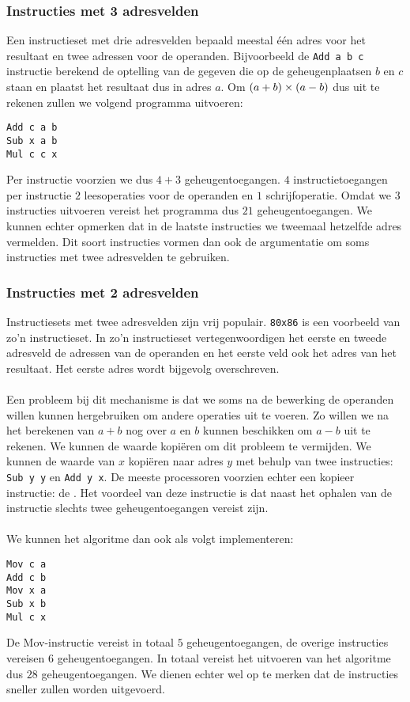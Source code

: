 \subsubsection{Instructies met 3 adresvelden}
Een instructieset met drie adresvelden bepaald meestal \'e\'en adres voor het resultaat en twee adressen voor de operanden. Bijvoorbeeld de \verb+Add a b c+ instructie berekend de optelling van de gegeven die op de geheugenplaatsen $b$ en $c$ staan en plaatst het resultaat dus in adres $a$. Om $\left( a+b \right)\times\left( a-b \right)$ dus uit te rekenen zullen we volgend programma uitvoeren:
\begin{verbatim}
Add c a b
Sub x a b
Mul c c x
\end{verbatim}
Per instructie voorzien we dus $4+3$ geheugentoegangen. $4$ instructietoegangen per instructie $2$ leesoperaties voor de operanden en $1$ schrijfoperatie. Omdat we $3$ instructies uitvoeren vereist het programma dus $21$ geheugentoegangen. We kunnen echter opmerken dat in de laatste instructies we tweemaal hetzelfde adres vermelden. Dit soort instructies vormen dan ook de argumentatie om soms instructies met twee adresvelden te gebruiken.
\subsubsection{Instructies met 2 adresvelden}
Instructiesets met twee adresvelden zijn vrij populair. \verb+80x86+ is een voorbeeld van zo'n instructieset. In zo'n instructieset vertegenwoordigen het eerste en tweede adresveld de adressen van de operanden en het eerste veld ook het adres van het resultaat. Het eerste adres wordt bijgevolg overschreven.
\paragraph{}
Een probleem bij dit mechanisme is dat we soms na de bewerking de operanden willen kunnen hergebruiken om andere operaties uit te voeren. Zo willen we na het berekenen van $a+b$ nog over $a$ en $b$ kunnen beschikken om $a-b$ uit te rekenen. We kunnen de waarde kopi\"eren om dit probleem te vermijden. We kunnen de waarde van $x$ kopi\"eren naar adres $y$ met behulp van twee instructies: \verb+Sub y y+ en \verb+Add y x+. De meeste processoren voorzien echter een kopieer instructie: de . Het voordeel van deze instructie is dat naast het ophalen van de instructie slechts twee geheugentoegangen vereist zijn.
\paragraph{}
We kunnen het algoritme dan ook als volgt implementeren:
\begin{verbatim}
Mov c a
Add c b
Mov x a
Sub x b
Mul c x
\end{verbatim}
De Mov-instructie vereist in totaal $5$ geheugentoegangen, de overige instructies vereisen $6$ geheugentoegangen. In totaal vereist het uitvoeren van het algoritme dus $28$ geheugentoegangen. We dienen echter wel op te merken dat de instructies sneller zullen worden uitgevoerd.
